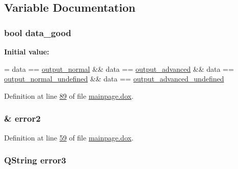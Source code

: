\subsection{Variable Documentation}
\subsubsection[{\texorpdfstring{data\+\_\+good}{data_good}}]{\setlength{\rightskip}{0pt plus 5cm}bool data\+\_\+good}\hypertarget{mainpage_8dox_a44c9a5050c8545eaf2e796025ab6f6cc}{}\label{mainpage_8dox_a44c9a5050c8545eaf2e796025ab6f6cc}
{\bfseries Initial value\+:}
\begin{DoxyCode}
=
        data == \hyperlink{mainpage_8dox_a0afa9d6eb2804da072bf16223098cab5}{output\_normal} &&
        data == \hyperlink{mainpage_8dox_afda71a8afe6713d362810784355a3b3f}{output\_advanced} &&
        data == \hyperlink{mainpage_8dox_a2acf283263ed72aa1a26ed7dd98aa62a}{output\_normal\_undefined} &&
        data == \hyperlink{mainpage_8dox_a7415e312c3c8019034882cde9a8d048d}{output\_advanced\_undefined}
\end{DoxyCode}


Definition at line \hyperlink{mainpage_8dox_source_l00089}{89} of file \hyperlink{mainpage_8dox_source}{mainpage.\+dox}.

\subsubsection[{\texorpdfstring{error2}{error2}}]{\setlength{\rightskip}{0pt plus 5cm}\& error2}\hypertarget{mainpage_8dox_a019326b383003608b449e099257babad}{}\label{mainpage_8dox_a019326b383003608b449e099257babad}


Definition at line \hyperlink{mainpage_8dox_source_l00059}{59} of file \hyperlink{mainpage_8dox_source}{mainpage.\+dox}.

\subsubsection[{\texorpdfstring{error3}{error3}}]{\setlength{\rightskip}{0pt plus 5cm}Q\+String error3}\hypertarget{mainpage_8dox_a0a5bd4c1e9106a6efb2b5ab3cbb58e29}{}\label{mainpage_8dox_a0a5bd4c1e9106a6efb2b5ab3cbb58e29}


